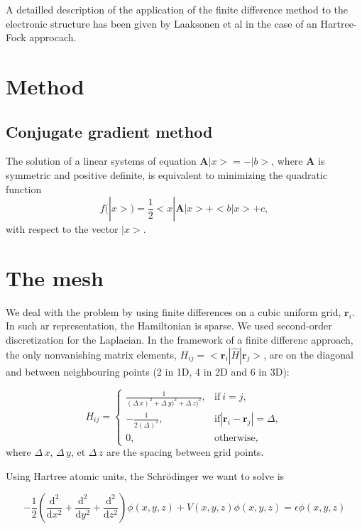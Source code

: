\documentclass[11pt,a4paper]{article}
\begin{document}
A detailled description of the application of the finite difference method to the electronic structure has been given by Laaksonen et al in the case of an Hartree-Fock approcach\cite{laaksonen1986}.

\section{Method}


\subsection{Conjugate gradient method}

The solution of a linear systems of equation $\bm{A}|x>=-|b>$, where $\bm{A}$ is symmetric and positive definite, is equivalent to minimizing the quadratic function
\begin{equation}
  f(|x>)=\frac{1}{2}<x|\bm{A}|x>+<b|x>+c,
\end{equation}
with respect to the vector $|x>$.


\section{The mesh}
We deal with the problem by using finite differences on a cubic uniform grid, ${\bm{r}_i}$.
In such ar representation,  the Hamiltonian is sparse.
We used second-order discretization for the Laplacian. In the framework of a finite differenc approach, the only nonvanishing matrix elements, $H_{ij}=<\bm{r}_i|\hat{H}|\bm{r}_j>$, are on the diagonal and between neighbouring points (2 in 1D, 4 in 2D and 6 in 3D):


  \begin{equation}
    H_{ij}=
    \begin{cases}
      \frac{1}{(\Delta\,x)^2+\Delta\,y)^2+\Delta\,z)^2}, & \text{if}\ i=j, \\
      -\frac{1}{2(\Delta)^2}, & \text{if} |\bm{r}_i-\bm{r}_j|=\Delta,\\
      0,&\text{otherwise,}
    \end{cases}
  \end{equation}
where $\Delta\,x$, $\Delta\,y$, et $\Delta\,z$ are the spacing between grid points.


Using Hartree atomic units, the Schr\"odinger we want to solve is 


\begin{equation}
  \label{eq:1}
  -\frac{1}{2}\left(\frac{\mathrm{d}^2}{\mathrm{d}x^2}+\frac{\mathrm{d}^2}{\mathrm{d}y^2}+\frac{\mathrm{d}^2}{\mathrm{d}z^2}\right)\phi(x,y,z)+V(x,y,z)\phi(x,y,z)=\epsilon\phi(x,y,z)
\end{equation}
\end{document}
